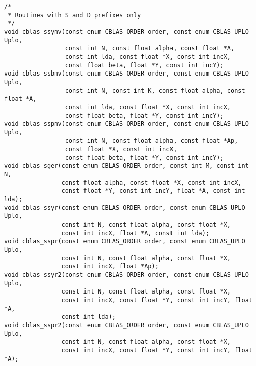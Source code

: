 \documentclass{article}
\begin{document}
\begin{Verbatim}[fontsize=\small,fontfamily=tt,fontshape=rm]
/* 
 * Routines with S and D prefixes only
 */
void cblas_ssymv(const enum CBLAS_ORDER order, const enum CBLAS_UPLO Uplo,
                 const int N, const float alpha, const float *A,
                 const int lda, const float *X, const int incX,
                 const float beta, float *Y, const int incY);
void cblas_ssbmv(const enum CBLAS_ORDER order, const enum CBLAS_UPLO Uplo,
                 const int N, const int K, const float alpha, const float *A,
                 const int lda, const float *X, const int incX,
                 const float beta, float *Y, const int incY);
void cblas_sspmv(const enum CBLAS_ORDER order, const enum CBLAS_UPLO Uplo,
                 const int N, const float alpha, const float *Ap,
                 const float *X, const int incX,
                 const float beta, float *Y, const int incY);
void cblas_sger(const enum CBLAS_ORDER order, const int M, const int N,
                const float alpha, const float *X, const int incX,
                const float *Y, const int incY, float *A, const int lda);
void cblas_ssyr(const enum CBLAS_ORDER order, const enum CBLAS_UPLO Uplo,
                const int N, const float alpha, const float *X,
                const int incX, float *A, const int lda);
void cblas_sspr(const enum CBLAS_ORDER order, const enum CBLAS_UPLO Uplo,
                const int N, const float alpha, const float *X,
                const int incX, float *Ap);
void cblas_ssyr2(const enum CBLAS_ORDER order, const enum CBLAS_UPLO Uplo,
                const int N, const float alpha, const float *X,
                const int incX, const float *Y, const int incY, float *A,
                const int lda);
void cblas_sspr2(const enum CBLAS_ORDER order, const enum CBLAS_UPLO Uplo,
                const int N, const float alpha, const float *X,
                const int incX, const float *Y, const int incY, float *A);


\end{Verbatim}
\end{document}
